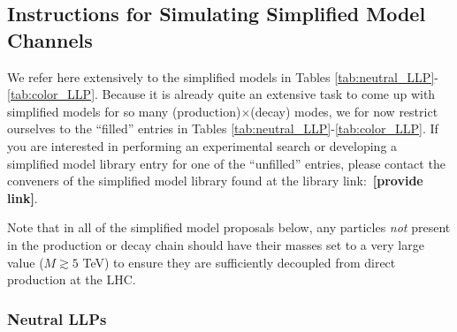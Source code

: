 \subsection{Instructions for Simulating Simplified Model Channels}

We refer here extensively to the simplified models in Tables  \ref{tab:neutral_LLP}-\ref{tab:color_LLP}. Because it is already quite an extensive task to come up with simplified models for so many (production)$\times$(decay) modes, we for now restrict ourselves to the ``filled'' entries in Tables  \ref{tab:neutral_LLP}-\ref{tab:color_LLP}. If you are interested in performing an experimental search or developing a simplified model library entry for one of the ``unfilled'' entries, please contact the conveners of the simplified model library found at the library link:~{\bf [provide link]}.

Note that in all of the simplified model proposals below, any particles \emph{not} present in the production or decay chain should have their masses set to a very large value ($M\gtrsim5$ TeV) to ensure they are sufficiently decoupled from direct production at the LHC.

\subsubsection{Neutral LLPs}



